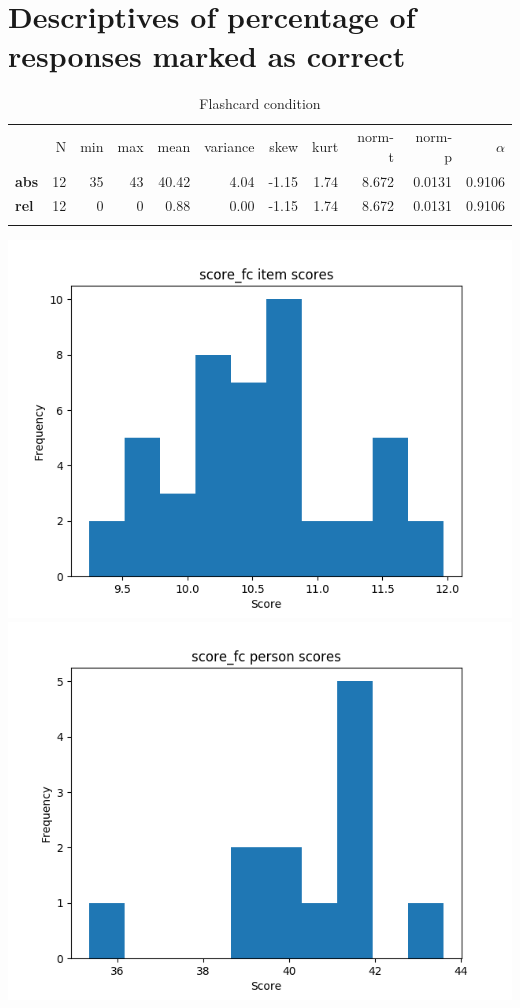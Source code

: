 \section{Descriptives of percentage of responses marked as correct}

\begin{longtable}[c]{@{}lrrrrrrrrrr@{}}
\caption{Flashcard condition}
\endfirsthead
\toprule\addlinespace
& N & min & max & mean & variance & skew & kurt & norm-t &
norm-p & $\alpha$
\\\addlinespace
\midrule
\textbf{abs} & 12 & 35 & 43 & 40.42 & 4.04 & -1.15 & 1.74 & 8.672 &
0.0131 & 0.9106
\\\addlinespace
\textbf{rel} & 12 & 0 & 0 & 0.88 & 0.00 & -1.15 & 1.74 & 8.672 & 0.0131
& 0.9106
\\\addlinespace
\bottomrule
\end{longtable}

\includegraphics{img/score_fc_diff.png} \includegraphics{img/score_fc_abil.png}


